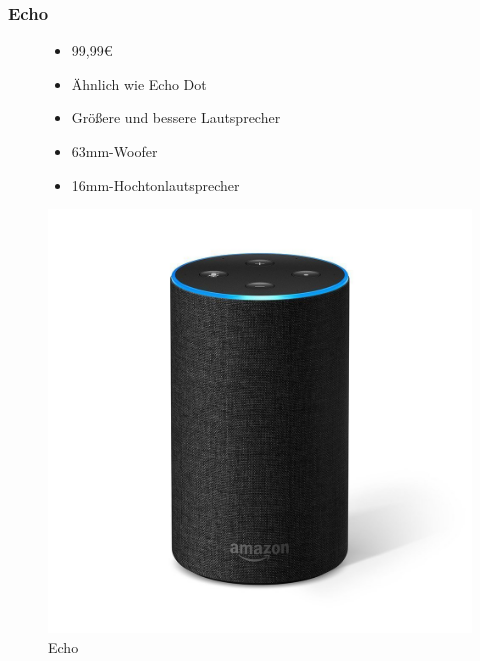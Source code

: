 \subsubsection{Echo}
\begin{figure}[H]
	\begin{minipage}{0.45\textwidth}
		\begin{itemize}
			\item 99,99€
			\item Ähnlich wie Echo Dot
			\item Größere und bessere Lautsprecher
			\item 63mm-Woofer
			\item 16mm-Hochtonlautsprecher
		\end{itemize}
	\end{minipage}
	\hfill
	\begin{minipage}{0.45\textwidth}
		\centering
		\includegraphics[width=\textwidth]{content/img/echo}
		\caption[Echo]{Echo}
	\end{minipage}
\end{figure}

